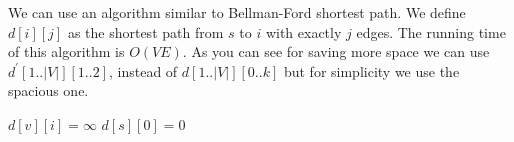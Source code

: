 \documentclass{book}
\begin{document}
\begin{enumerate}
\begin{enumerate}
\begin{itemize}
					\par We can use an algorithm similar to Bellman-Ford shortest path. We define $d[i][j]$ as the shortest path from $s$ to $i$ with exactly $j$ edges. The running time of this algorithm is $O(VE)$. As you can see for saving more space we can use $d^{\prime}[1..|V|][1..2]$, instead of $d[1..|V|][0..k]$ but for simplicity we use the spacious one.
                    \begin{algorithm}[h!]
                        \begin{algorithmic}[1]
                                		\State $d[v][i] = \infty$
                                	\EndFor
                                \EndFor
                                \State $d[s][0] = 0$
                            \EndFunction
                        \end{algorithmic}
                        

\end{algorithm}
\end{itemize}
\end{enumerate}
\end{enumerate}
\end{document}
